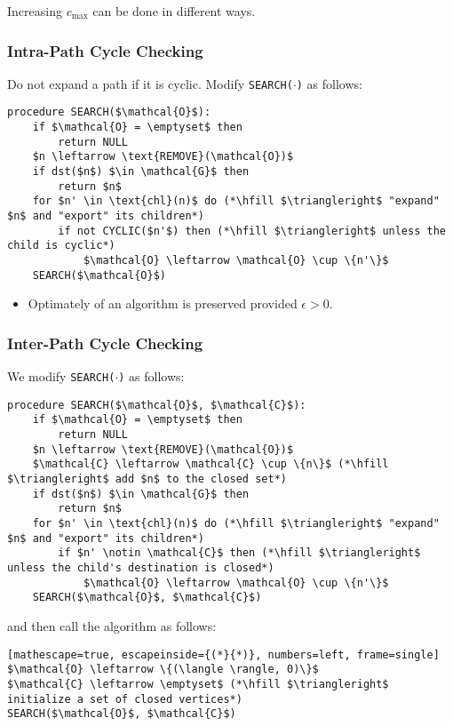 \begin{warning}
    Increasing $c_{\text{max}}$ can be done in different ways.
\end{warning}

\subsubsection{Intra-Path Cycle Checking}
\begin{definition}
    Do not expand a path if it is cyclic. Modify \texttt{SEARCH($\cdot$)} as follows:

\begin{lstlisting}
procedure SEARCH($\mathcal{O}$):
    if $\mathcal{O} = \emptyset$ then
        return NULL
    $n \leftarrow \text{REMOVE}(\mathcal{O})$
    if dst($n$) $\in \mathcal{G}$ then
        return $n$
    for $n' \in \text{chl}(n)$ do (*\hfill $\triangleright$ "expand" $n$ and "export" its children*)
        if not CYCLIC($n'$) then (*\hfill $\triangleright$ unless the child is cyclic*)
            $\mathcal{O} \leftarrow \mathcal{O} \cup \{n'\}$
    SEARCH($\mathcal{O}$)
\end{lstlisting}
\begin{itemize}
    \item Optimately of an algorithm is preserved provided $\epsilon>0$.
\end{itemize}

\end{definition}

\subsubsection{Inter-Path Cycle Checking}
\begin{definition}
    We modify \texttt{SEARCH($\cdot$)} as follows:

\begin{lstlisting}
procedure SEARCH($\mathcal{O}$, $\mathcal{C}$):
    if $\mathcal{O} = \emptyset$ then
        return NULL
    $n \leftarrow \text{REMOVE}(\mathcal{O})$
    $\mathcal{C} \leftarrow \mathcal{C} \cup \{n\}$ (*\hfill $\triangleright$ add $n$ to the closed set*)
    if dst($n$) $\in \mathcal{G}$ then
        return $n$
    for $n' \in \text{chl}(n)$ do (*\hfill $\triangleright$ "expand" $n$ and "export" its children*)
        if $n' \notin \mathcal{C}$ then (*\hfill $\triangleright$ unless the child's destination is closed*)
            $\mathcal{O} \leftarrow \mathcal{O} \cup \{n'\}$
    SEARCH($\mathcal{O}$, $\mathcal{C}$)
\end{lstlisting}

and then call the algorithm as follows:

\begin{lstlisting}[mathescape=true, escapeinside={(*}{*)}, numbers=left, frame=single]
$\mathcal{O} \leftarrow \{(\langle \rangle, 0)\}$
$\mathcal{C} \leftarrow \emptyset$ (*\hfill $\triangleright$ initialize a set of closed vertices*)
SEARCH($\mathcal{O}$, $\mathcal{C}$)
\end{lstlisting}

\end{definition}

